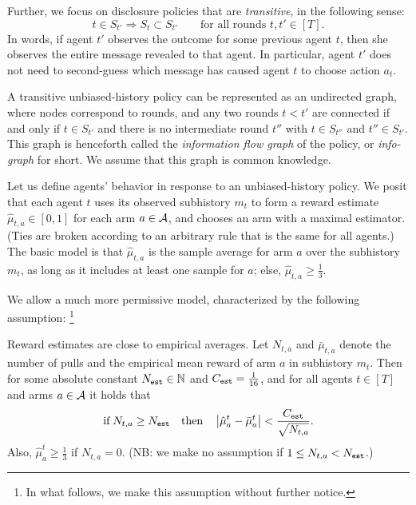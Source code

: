 Further, we focus on disclosure policies that are \emph{transitive}, in the following sense:
\[ t\in S_{t'} \Rightarrow S_t\subset S_{t'}
    \qquad \text{for all rounds $t,t'\in [T]$}. \]
In words, if agent $t'$ observes the outcome for some previous agent $t$, then she observes the entire message revealed to that agent. In particular, agent $t'$ does not need to second-guess which message has caused agent $t$ to choose action $a_t$.

A transitive unbiased-history policy can be represented as an undirected graph, where nodes correspond to rounds, and any two rounds $t<t'$ are connected if and only if $t\in S_{t'}$ and there is no intermediate round $t''$ with
    $t\in S_{t''}$ and $t''\in S_{t'}$.
This graph is henceforth called the \emph{information flow graph} of the policy, or \emph{info-graph} for short. We assume that this graph is common knowledge.

 Let us define agents' behavior in response to an unbiased-history policy. We posit that each agent $t$ uses its observed subhistory $m_t$ to form a reward estimate $\hat{\mu}_{t,a} \in [0,1]$ for each arm $a\in \mathcal{A}$, and chooses an arm with a maximal estimator. (Ties are broken according to an arbitrary rule that is the same for all agents.) The basic model is that $\hat{\mu}_{t,a}$ is the sample average for arm $a$ over the subhistory $m_t$, as long as it includes at least one sample for $a$; else, $\hat{\mu}_{t,a}\geq \tfrac13$.

We allow a much more permissive model, characterized by the following assumption:%
\footnote{In what follows, we make this assumption without further notice.}


\begin{assumption}\label{ass:embehave}
Reward estimates are close to empirical averages. Let $N_{t,a}$ and $\bar{\mu}_{t,a}$ denote the number of pulls and the empirical mean reward of arm $a$ in subhistory $m_t$. Then for some absolute constant $N_{\mathtt{est}}\in \mathbb{N}$ and $C_{\mathtt{est}}=\tfrac{1}{16}$, and for all agents $t\in [T]$ and arms $a\in\mathcal{A}$ it holds that
\[
\text{if}\; N_{t,a} \geq N_{\mathtt{est}}
\quad\text{then}\quad
    \left|\hat{\mu}^t_a - \bar{\mu}^t_a \right| <
		\frac{C_{\mathtt{est}}}{\sqrt{N_{t,a}}}.
\]
Also,
    $\hat{\mu}^t_a\geq\tfrac13$ if $N_{t,a}=0$.
(NB: we make no assumption if $1\leq N_{t,a}<N_{\mathtt{est}}$.)
\end{assumption}

